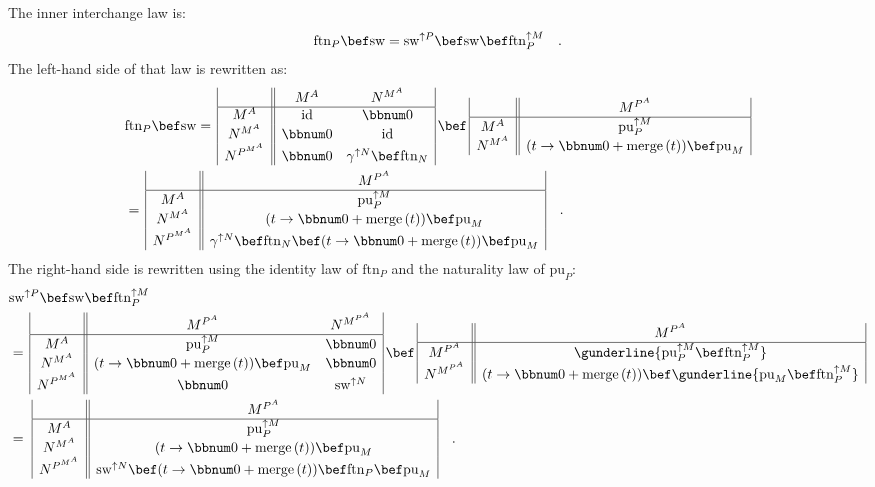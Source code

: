 The inner interchange law is:
\[
\text{ftn}_{P}\bef\text{sw}=\text{sw}^{\uparrow P}\bef\text{sw}\bef\text{ftn}_{P}^{\uparrow M}\quad.
\]
The left-hand side of that law is rewritten as:
\begin{align*}
 & \text{ftn}_{P}\bef\text{sw}=\,\begin{array}{|c||cc|}
 & M^{A} & N^{M^{A}}\\
\hline M^{A} & \text{id} & \bbnum 0\\
N^{M^{A}} & \bbnum 0 & \text{id}\\
N^{P^{M^{A}}} & \bbnum 0 & \gamma^{\uparrow N}\bef\text{ftn}_{N}
\end{array}\,\bef\,\begin{array}{|c||c|}
 & M^{P^{A}}\\
\hline M^{A} & \text{pu}_{P}^{\uparrow M}\\
N^{M^{A}} & (t\rightarrow\bbnum 0+\text{merge}\,(t))\bef\text{pu}_{M}
\end{array}\\
 & =\,\begin{array}{|c||c|}
 & M^{P^{A}}\\
\hline M^{A} & \text{pu}_{P}^{\uparrow M}\\
N^{M^{A}} & (t\rightarrow\bbnum 0+\text{merge}\,(t))\bef\text{pu}_{M}\\
N^{P^{M^{A}}} & \gamma^{\uparrow N}\bef\text{ftn}_{N}\bef(t\rightarrow\bbnum 0+\text{merge}\,(t))\bef\text{pu}_{M}
\end{array}\quad.
\end{align*}
The right-hand side is rewritten using the identity law of $\text{ftn}_{P}$
and the naturality law of $\text{pu}_{P}$:
\begin{align*}
 & \text{sw}^{\uparrow P}\bef\text{sw}\bef\text{ftn}_{P}^{\uparrow M}\\
 & =\,\begin{array}{|c||cc|}
 & M^{P^{A}} & N^{M^{P^{A}}}\\
\hline M^{A} & \text{pu}_{P}^{\uparrow M} & \bbnum 0\\
N^{M^{A}} & (t\rightarrow\bbnum 0+\text{merge}\,(t))\bef\text{pu}_{M} & \bbnum 0\\
N^{P^{M^{A}}} & \bbnum 0 & \text{sw}^{\uparrow N}
\end{array}\,\bef\,\begin{array}{|c||c|}
 & M^{P^{A}}\\
\hline M^{P^{A}} & \gunderline{\text{pu}_{P}^{\uparrow M}\bef\text{ftn}_{P}^{\uparrow M}}\\
N^{M^{P^{A}}} & (t\rightarrow\bbnum 0+\text{merge}\,(t))\bef\gunderline{\text{pu}_{M}\bef\text{ftn}_{P}^{\uparrow M}}
\end{array}\\
 & =\,\,\begin{array}{|c||c|}
 & M^{P^{A}}\\
\hline M^{A} & \text{pu}_{P}^{\uparrow M}\\
N^{M^{A}} & (t\rightarrow\bbnum 0+\text{merge}\,(t))\bef\text{pu}_{M}\\
N^{P^{M^{A}}} & \text{sw}^{\uparrow N}\bef(t\rightarrow\bbnum 0+\text{merge}\,(t))\bef\text{ftn}_{P}\bef\text{pu}_{M}
\end{array}\quad.
\end{align*}
